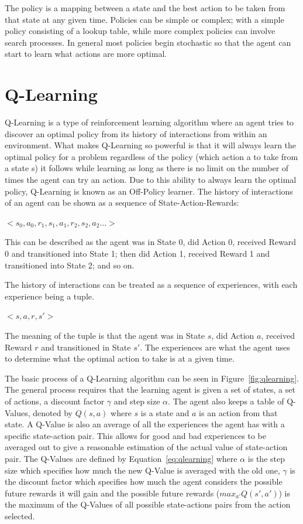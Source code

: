 The policy is a mapping between a state and the best action to be taken from that state at any given time. Policies can be simple or complex; with a simple policy consisting of a lookup table, while more complex policies can involve search processes. In general most policies begin stochastic so that the agent can start to learn what actions are more optimal.~\cite{barto1998reinforcement}

\section{Q-Learning}\label{sec:qlearning}
Q-Learning is a type of reinforcement learning algorithm where an agent tries to discover an optimal policy from its history of interactions from within an environment. What makes Q-Learning so powerful is that it will always learn the optimal policy for a problem regardless of the policy (which action a to take from a state s) it follows while learning as long as there is no limit on the number of times the agent can try an action. Due to this ability to always learn the optimal policy, Q-Learning is known as an Off-Policy learner. The history of interactions of an agent can be shown as a sequence of State-Action-Rewards:

\begin{center}
$<s_{0},a_{0},r_{1},s_{1},a_{1},r_{2},s_{2},a_{2}...>$
\end{center}

This can be described as the agent was in State 0, did Action 0, received Reward 0 and transitioned into State 1; then did Action 1, received Reward 1 and transitioned into State 2; and so on.

The history of interactions can be treated as a sequence of experiences, with each experience being a tuple.

\begin{center}
$<s,a,r,s'>$
\end{center}

The meaning of the tuple is that the agent was in State $s$, did Action $a$, received Reward $r$ and transitioned in State $s'$.  The experiences are what the agent uses to determine what the optimal action to take is at a given time.

The basic process of a Q-Learning algorithm can be seen in Figure~\ref{fig:qlearning}. The general process requires that the learning agent is given a set of states, a set of actions, a discount factor $\gamma$ and step size $\alpha$. The agent also keeps a table of Q-Values, denoted by $Q(s,a)$ where $s$ is a state and $a$ is an action from that state. A Q-Value is also an average of all the experiences the agent has with a specific state-action pair. This allows for good and bad experiences to be averaged out to give a reasonable estimation of the actual value of state-action pair. The Q-Values are defined by Equation~\ref{eq:qlearning} where $\alpha$ is the step size which specifies how much the new Q-Value is averaged with the old one, $\gamma$ is the discount factor which specifies how much the agent considers the possible future rewards it will gain and the possible future rewards ($max_{a'}Q(s',a')$) is the maximum of the Q-Values of all possible state-actions pairs from the action selected.  

